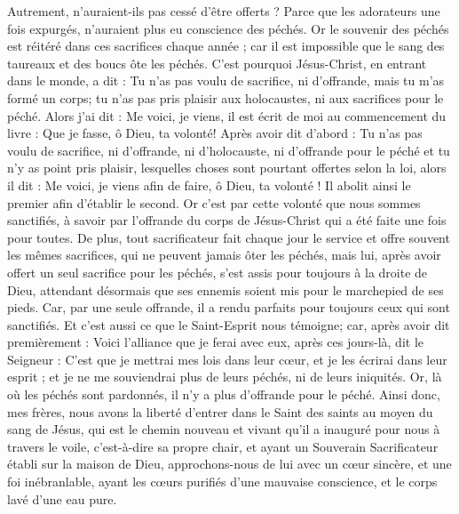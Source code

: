\begin{multicols}{2}
Autrement, n'auraient-ils pas cessé d'être offerts ? Parce que les adorateurs une fois expurgés, n'auraient plus eu conscience des péchés.
Or le souvenir des péchés est réitéré dans ces sacrifices chaque année ;
car il est impossible que le sang des taureaux et des boucs ôte les péchés.
C'est pourquoi Jésus-Christ, en entrant dans le monde, a dit : Tu n'as pas voulu de sacrifice, ni d'offrande, mais tu m'as formé un corps;
tu n'as pas pris plaisir aux holocaustes, ni aux sacrifices pour le péché.
Alors j'ai dit : Me voici, je viens, il est écrit de moi au commencement du livre : Que je fasse, ô Dieu, ta volonté!
Après avoir dit d'abord : Tu n'as pas voulu de sacrifice, ni d'offrande, ni d'holocauste, ni d'offrande pour le péché et tu n'y as point pris plaisir, lesquelles choses sont pourtant offertes selon la loi, alors il dit : Me voici, je viens afin de faire, ô Dieu, ta volonté !
Il abolit ainsi le premier afin d'établir le second.
Or c'est par cette volonté que nous sommes sanctifiés, à savoir par l'offrande du corps de Jésus-Christ qui a été faite une fois pour toutes.
De plus, tout sacrificateur fait chaque jour le service et offre souvent les mêmes sacrifices, qui ne peuvent jamais ôter les péchés,
mais lui, après avoir offert un seul sacrifice pour les péchés, s'est assis pour toujours à la droite de Dieu,
attendant désormais que ses ennemis soient mis pour le marchepied de ses pieds.
Car, par une seule offrande, il a rendu parfaits pour toujours ceux qui sont sanctifiés.
Et c'est aussi ce que le Saint-Esprit nous témoigne; car, après avoir dit premièrement :
Voici l'alliance que je ferai avec eux, après ces jours-là, dit le Seigneur : C'est que je mettrai mes lois dans leur cœur, et je les écrirai dans leur esprit ;
et je ne me souviendrai plus de leurs péchés, ni de leurs iniquités.
Or, là où les péchés sont pardonnés, il n'y a plus d'offrande pour le péché.
Ainsi donc, mes frères, nous avons la liberté d'entrer dans le Saint des saints au moyen du sang de Jésus,
qui est le chemin nouveau et vivant qu'il a inauguré pour nous à travers le voile, c'est-à-dire sa propre chair,
et ayant un Souverain Sacrificateur établi sur la maison de Dieu,
approchons-nous de lui avec un cœur sincère, et une foi inébranlable, ayant les cœurs purifiés d'une mauvaise conscience, et le corps lavé d'une eau pure.

\end{multicols}
